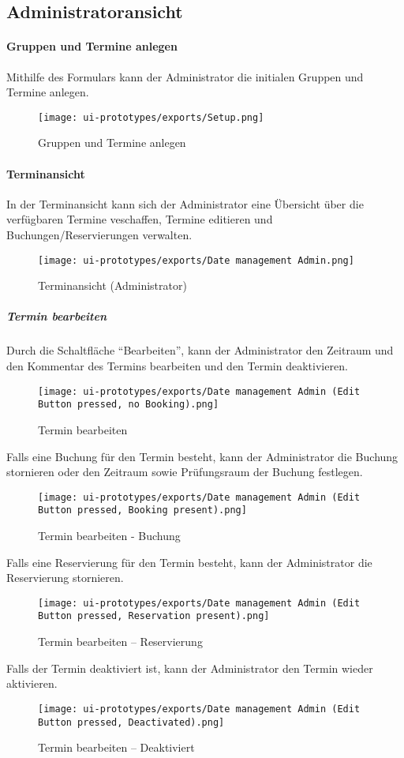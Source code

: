 \subsection{Administratoransicht}

\paragraph{Gruppen und Termine anlegen}
Mithilfe des Formulars kann der Administrator die initialen Gruppen und
Termine anlegen.
\begin{figure}
  \centering
  \texttt{[image: ui-prototypes/exports/Setup.png]}
  \caption{Gruppen und Termine anlegen}
  \label{fig:setup}
\end{figure}

\paragraph{Terminansicht}
In der Terminansicht kann sich der Administrator eine Übersicht über die
verfügbaren Termine veschaffen, Termine editieren und
Buchungen/Reservierungen verwalten.
\begin{figure}
  \centering
  \texttt{[image: ui-prototypes/exports/Date management Admin.png]}
  \caption{Terminansicht (Administrator)}
  \label{fig:date-management-admin}
\end{figure}

\subparagraph{Termin bearbeiten}
Durch die Schaltfläche ``Bearbeiten'', kann der Administrator den
Zeitraum und den Kommentar des Termins bearbeiten und den Termin
deaktivieren.
\begin{figure}
  \centering
  \texttt{[image: ui-prototypes/exports/Date management Admin (Edit Button pressed, no Booking).png]}
  \caption{Termin bearbeiten}
  \label{fig:edit-button-pressed-no-booking}
\end{figure}
Falls eine Buchung für den Termin besteht, kann der Administrator die
Buchung stornieren oder den Zeitraum sowie Prüfungsraum der Buchung
festlegen.
\begin{figure}
  \centering
  \texttt{[image: ui-prototypes/exports/Date management Admin (Edit Button pressed, Booking present).png]}
  \caption{Termin bearbeiten - Buchung}
  \label{fig:edit-button-pressed-booking}
\end{figure}
Falls eine Reservierung für den Termin besteht, kann der Administrator
die Reservierung stornieren.
\begin{figure}
  \centering
  \texttt{[image: ui-prototypes/exports/Date management Admin (Edit Button pressed, Reservation present).png]}
  \caption{Termin bearbeiten – Reservierung}
  \label{fig:edit-button-pressed-reservation}
\end{figure}
Falls der Termin deaktiviert ist, kann der Administrator den Termin
wieder aktivieren.
\begin{figure}
  \centering
  \texttt{[image: ui-prototypes/exports/Date management Admin (Edit Button pressed, Deactivated).png]}
  \caption{Termin bearbeiten – Deaktiviert}
  \label{fig:edit-button-pressed-deactivated}
\end{figure}

